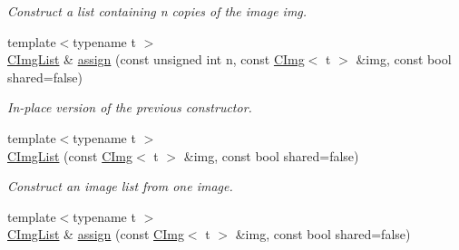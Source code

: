 \begin{DoxyCompactItemize}
\begin{DoxyCompactList}\small\item\em Construct a list containing n copies of the image img. \item\end{DoxyCompactList}\item 
\hypertarget{structcimg__library_1_1_c_img_list_af900415279f0c2c7fbb5a877e999c747}{
{\footnotesize template$<$typename t $>$ }\\\hyperlink{structcimg__library_1_1_c_img_list}{CImgList} \& \hyperlink{structcimg__library_1_1_c_img_list_af900415279f0c2c7fbb5a877e999c747}{assign} (const unsigned int n, const \hyperlink{structcimg__library_1_1_c_img}{CImg}$<$ t $>$ \&img, const bool shared=false)}
\label{structcimg__library_1_1_c_img_list_af900415279f0c2c7fbb5a877e999c747}

\begin{DoxyCompactList}\small\item\em In-\/place version of the previous constructor. \item\end{DoxyCompactList}\item 
\hypertarget{structcimg__library_1_1_c_img_list_ac03712b04fdab675041e9aa68de5fbcc}{
{\footnotesize template$<$typename t $>$ }\\\hyperlink{structcimg__library_1_1_c_img_list_ac03712b04fdab675041e9aa68de5fbcc}{CImgList} (const \hyperlink{structcimg__library_1_1_c_img}{CImg}$<$ t $>$ \&img, const bool shared=false)}
\label{structcimg__library_1_1_c_img_list_ac03712b04fdab675041e9aa68de5fbcc}

\begin{DoxyCompactList}\small\item\em Construct an image list from one image. \item\end{DoxyCompactList}\item 
\hypertarget{structcimg__library_1_1_c_img_list_a29a2dc09626def5d0259a2f07a99576f}{
{\footnotesize template$<$typename t $>$ }\\\hyperlink{structcimg__library_1_1_c_img_list}{CImgList} \& \hyperlink{structcimg__library_1_1_c_img_list_a29a2dc09626def5d0259a2f07a99576f}{assign} (const \hyperlink{structcimg__library_1_1_c_img}{CImg}$<$ t $>$ \&img, const bool shared=false)}
\label{structcimg__library_1_1_c_img_list_a29a2dc09626def5d0259a2f07a99576f}


\end{DoxyCompactItemize}
